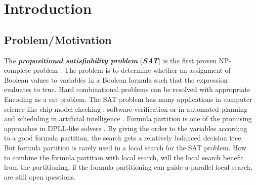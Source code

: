 \documentclass[12pt,a4paper,twoside]{scrartcl}
\numberwithin{equation}{section}
\begin{document}
\vfill\vfill\vfill
\clearpage


\pagestyle{plain}
  
\renewcommand\sectionmark[1]{\markboth{\thesection\quad\MakeUppercase{#1}}{\thesection\quad\MakeUppercase{#1}}}
\renewcommand\subsectionmark[1]{\markright{\thesubsection\quad\MakeUppercase{#1}}}


\tableofcontents
\afterpage{\null\newpage}
\clearpage

\pagestyle{normal}

\section{Introduction} 
\label{sec:Intro}
\subsection{Problem/Motivation} 
The \emph{\textbf{propositional satisfiability problem}} (\emph{\textbf{SAT}}) is the first proven NP-complete problem \cite{cook1971complexity}. The problem is to determine whether an assignment of Boolean values to variables in a  Boolean formula such that the expression evaluates to true. Hard combinational problems can be resolved with appropriate Encoding as a sat problem.
The SAT problem has many applications in computer science like chip model checking  \cite{clarke2001bounded}, software verification \cite{ivanvcic2008efficient} or in automated planning and scheduling in artificial intelligence  \cite{kautz1999unifying}. 
Formula partition is one of the promising approaches in DPLL-like solvers  \cite{mann2017guiding}. By giving the order to the variables according to a good formula partition, the search gets a relatively balanced decision tree. But formula partition is rarely used in a local search for the SAT problem. How to combine the formula partition with local search, will the local search benefit from the partitioning, if the formula partitioning can guide a parallel local search, are still open questions. 
\end{document}
